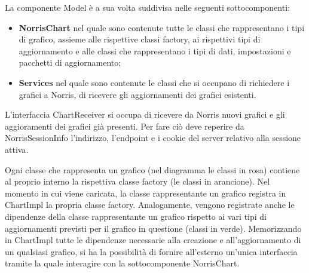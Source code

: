 La componente Model è a sua volta suddivisa nelle seguenti sottocomponenti:
\begin{itemize}
\item \textbf{NorrisChart} nel quale sono contenute tutte le classi che rappresentano i tipi di grafico, assieme alle rispettive classi factory, ai rispettivi tipi di aggiornamento e alle classi che rappresentano i tipi di dati, impostazioni e pacchetti di aggiornamento; 
\item \textbf{Services} nel quale sono contenute le classi che si occupano di richiedere i grafici a Norris, di ricevere gli aggiornamenti dei grafici esistenti.
\end{itemize}

L'interfaccia ChartReceiver si occupa di ricevere da Norris nuovi grafici e gli aggioramenti dei grafici già presenti. Per fare ciò deve reperire da NorrisSessionInfo l'indirizzo, l'endpoint e i cookie del server relativo alla sessione attiva.

Ogni classe che rappresenta un grafico (nel diagramma le classi in rosa) contiene al proprio interno la rispettiva classe factory (le classi in arancione). Nel momento in cui viene caricata, la classe rappresentante un grafico registra in ChartImpl la propria classe factory. Analogamente, vengono registrate anche le dipendenze della classe rappresentante un grafico rispetto ai vari tipi di aggiornamenti previsti per il grafico in questione (classi in verde). Memorizzando in ChartImpl tutte le dipendenze necessarie alla creazione e all'aggiornamento di un qualsiasi grafico, si ha la possibilità di fornire all'esterno un'unica interfaccia tramite la quale interagire con la sottocomponente NorrisChart.

